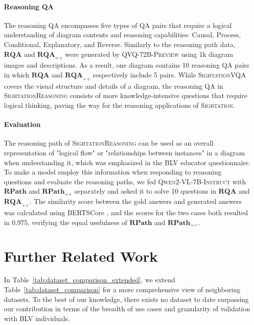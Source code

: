 \paragraph{Reasoning QA}
The reasoning QA encompasses five types of QA pairs that require a logical understanding of diagram contents and reasoning capabilities: Causal, Process, Conditional, Explanatory, and Reverse. Similarly to the reasoning path data, $\textbf{RQA}$ and $\textbf{RQA}_{\texttt{++}}$ were generated by \textsc{QVQ-72B-Preview} using 1k diagram images and descriptions. As a result, one diagram contains 10 reasoning QA pairs in which $\textbf{RQA}$ and $\textbf{RQA}_{\texttt{++}}$ respectively include 5 pairs. While \textsc{SightationVQA} covers the visual structure and details of a diagram, the reasoning QA in \textsc{SightationReasoning} consists of more knowledge-intensive questions that require logical thinking, paving the way for the reasoning applications of \textsc{Sightation}. 

\paragraph{Evaluation} The reasoning path of \textsc{SightationReasoning} can be used as an overall representation of "logical flow" or "relationships between instances" in a diagram when understanding it, which was emphasized in the BLV educator questionnaire. To make a model employ this information when responding to reasoning questions and evaluate the reasoning paths, we fed \textsc{Qwen2-VL-7B-Instruct} with $\textbf{RPath}$ and $\textbf{RPath}_{\texttt{++}}$ separately and asked it to solve 10 questions in $\textbf{RQA}$ and $\textbf{RQA}_{\texttt{++}}$. The similarity score between the gold answers and generated answers was calculated using BERTSCore \cite{zhang2019bertscore}, and the scores for the two cases both resulted in 0.975, verifying the equal usefulness of $\textbf{RPath}$ and $\textbf{RPath}_{\texttt{++}}$.


\section{Further Related Work}

In Table~\ref{tab:dataset_comparison_extended}, we extend Table~\ref{tab:dataset_comparison} for a more comprehensive view of neighboring datasets. To the best of our knowledge, there exists no dataset to date surpassing our contribution in terms of the breadth of use cases and granularity of validation with BLV individuals.

